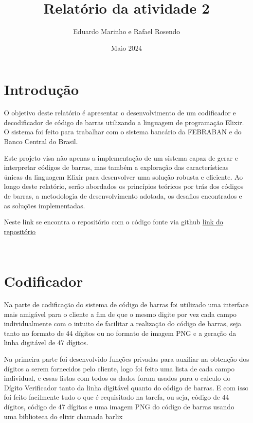\documentclass{article}
\title{Relatório da atividade 2}
\author{Eduardo Marinho e Rafael Rosendo}
\date{Maio 2024}
\begin{document}
\maketitle

\section{Introdução}

O objetivo deste relatório é apresentar o desenvolvimento de um codificador e decodificador de código de barras utilizando a linguagem de programação Elixir. O sistema foi feito para trabalhar com o sistema bancário da FEBRABAN e do Banco Central do Brasil.

Este projeto visa não apenas a implementação de um sistema capaz de gerar e interpretar códigos de barras, mas também a exploração das características únicas da linguagem Elixir para desenvolver uma solução robusta e eficiente. Ao longo deste relatório, serão abordados os princípios teóricos por trás dos códigos de barras, a metodologia de desenvolvimento adotada, os desafios encontrados e as soluções implementadas.


Neste link se encontra o repositório com o código fonte via github \href{https://github.com/enfmarinho/codigo_barras}{link do repositório}

\\


\section{Codificador}
Na parte de codificação do sistema de código de barras foi utilizado uma interface mais amigável para o cliente a fim de que o mesmo digite por vez cada campo individualmente com o intuito de facilitar a realização do código de barras, seja tanto no formato de 44 dígitos ou no formato de imagem PNG e a geração da linha digitável de 47 dígitos. 



Na primeira parte foi desenvolvido funções privadas para auxiliar na obtenção dos dígitos a serem fornecidos pelo cliente, logo foi feito uma lista de cada campo individual, e essas listas com todos os dados foram usados para o calculo do Dígito Verificador tanto da linha digitável quanto do código de barras. E com isso foi feito facilmente tudo o que é requisitado na tarefa, ou seja, código de 44 dígitos, código de 47 dígitos e uma imagem PNG do código de barras usando uma biblioteca do elixir chamada barlix
\end{document}
